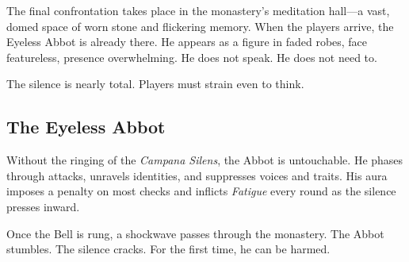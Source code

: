 \documentclass[nodeprecatedcode,bg=print]{dndbook/dndbook}
\begin{document}
The final confrontation takes place in the monastery’s meditation hall—a vast, domed space of worn stone and flickering memory. When the players arrive, the Eyeless Abbot is already there. He appears as a figure in faded robes, face featureless, presence overwhelming. He does not speak. He does not need to.

The silence is nearly total. Players must strain even to think.

\subsection{The Eyeless Abbot}

Without the ringing of the \emph{Campana Silens}, the Abbot is untouchable. He phases through attacks, unravels identities, and suppresses voices and traits. His aura imposes a penalty on most checks and inflicts \emph{Fatigue} every round as the silence presses inward.

Once the Bell is rung, a shockwave passes through the monastery. The Abbot stumbles. The silence cracks. For the first time, he can be harmed.
\end{document}
